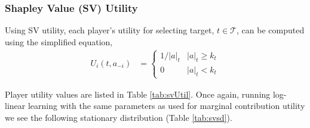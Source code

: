 \documentclass[11pt, onecolumn, compsoc, letterpaper]{article}
\newcommand{\Ta}{\mathcal{T}} %
\begin{document}
\subsubsection{Shapley Value (SV) Utility}
Using SV utility, each player's utility for selecting target, $t \in \Ta$, can be computed using the simplified equation,
\begin{align}
	U_i(t, a_{-i}) & = \left\{
		\begin{array}{ll}	
			1/|a|_t & |a|_t \geq k_t\\
			0 & |a|_t < k_t
		\end{array}\right.
\end{align}

Player utility values are listed in Table \ref{tab:svUtil}. Once again, running log-linear learning with the same parameters as used for marginal contribution utility we see the following stationary distribution (Table \ref{tab:svsd}).
\end{document}
